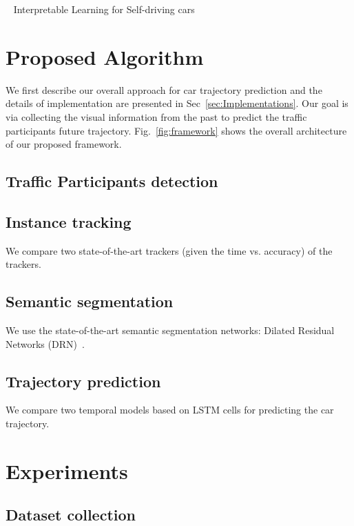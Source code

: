 \documentclass[10pt,twocolumn,letterpaper]{article}
\begin{document}
~\cite{kim2017interpretable} Interpretable Learning for Self-driving cars


\section{Proposed Algorithm}

We first describe our overall approach for car trajectory prediction and the details of implementation are presented in Sec~\ref{sec:Implementations}.
Our goal is via collecting the visual information from the past to predict the traffic participants future trajectory. Fig.~\ref{fig:framework} shows the overall architecture of our proposed framework.

\subsection{Traffic Participants detection}


\subsection{Instance tracking}

We compare two state-of-the-art trackers (given the time vs. accuracy) of the trackers.

\subsection{Semantic segmentation}
We use the state-of-the-art semantic segmentation networks: Dilated Residual Networks (DRN)~\cite{yu2017dilated}.

\subsection{Trajectory prediction}


We compare two temporal models based on LSTM cells for predicting the car trajectory.



\section{Experiments}

\subsection{Dataset collection}
\end{document}
